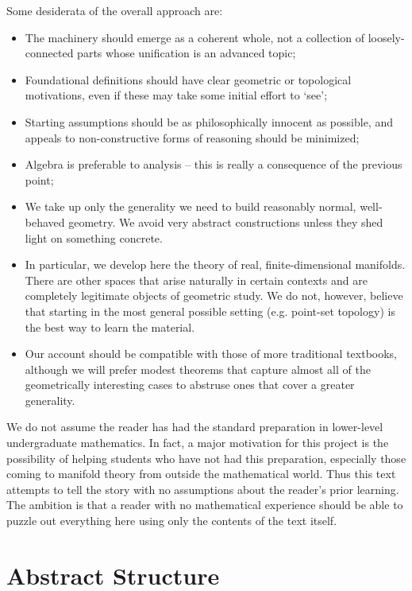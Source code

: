 \documentclass[oneside,english]{amsbook}
\numberwithin{section}{chapter}
\theoremstyle{plain}
\theoremstyle{definition}
\begin{document}
Some desiderata of the overall approach are:
\begin{itemize}
	\item{The machinery should emerge as a coherent whole, not a collection of loosely-connected parts whose unification is an advanced topic;} 
	\item{Foundational definitions should have clear geometric or topological motivations, even if these may take some initial effort to `see';} 
	\item{Starting assumptions should be as philosophically innocent as possible, and appeals to non-constructive forms of reasoning should be minimized;}
	\item{Algebra is preferable to analysis -- this is really a consequence of the previous point;}
	\item{We take up only the generality we need to build reasonably normal, well-behaved geometry. We avoid very abstract constructions unless they shed light on something concrete.}
	\item{In particular, we develop here the theory of real, finite-dimensional manifolds. There are other spaces that arise naturally in certain contexts and are completely legitimate objects of geometric study. We do not, however, believe that starting in the most general possible setting (e.g. point-set topology) is the best way to learn the material.}	
	\item{Our account should be compatible with those of more traditional textbooks, although we will prefer modest theorems that capture almost all of the geometrically interesting cases to abstruse ones that cover a greater generality.}
\end{itemize}

We do not assume the reader has had the standard preparation in lower-level undergraduate mathematics. In fact, a major motivation for this project is the possibility of helping students who have not had this preparation, especially those coming to manifold theory from outside the mathematical world. Thus this text attempts to tell the story with no assumptions about the reader's prior learning. The ambition is that a reader with no mathematical experience should be able to puzzle out everything here using only the contents of the text itself.

\chapter{Abstract Structure}
\end{document}
